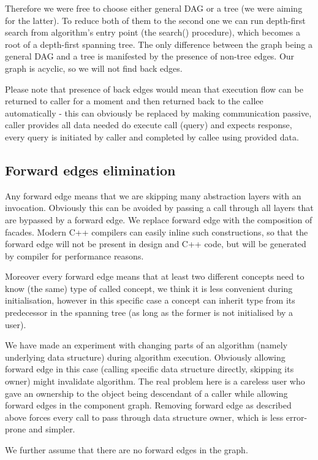 Therefore we were free to choose either general DAG or a tree (we were aiming
for the latter). To reduce both of them to the second one we can run
depth-first search from algorithm's entry point (the search() procedure), which
becomes a root of a depth-first spanning tree. The only difference between the
graph being a general DAG and a tree is manifested by the presence of non-tree
edges. Our graph is acyclic, so we will not find back edges.

Please note that presence of back edges would mean that execution flow can be
returned to caller for a moment and then returned back to the callee
automatically - this can obviously be replaced by making communication
passive, caller provides all data needed do execute call (query) and expects
response, every query is initiated by caller and completed by callee using
provided data.

\subsection{Forward edges elimination}
Any forward edge means that we are skipping many abstraction layers with an
invocation. Obviously this can be avoided by passing a call through all layers
that are bypassed by a forward edge. We replace forward edge with the composition
of facades. Modern C++ compilers can easily inline such constructions, so that
the forward edge will not be present in design and C++ code, but will be
generated by compiler for performance reasons.

Moreover every forward edge means that at least two different concepts need to
know (the same) type of called concept, we think it is less convenient during
initialisation, however in this specific case a concept can inherit type from
its predecessor in the spanning tree (as long as the former is not initialised
by a user).

We have made an experiment with changing parts of an algorithm (namely
underlying data structure) during algorithm execution. Obviously allowing
forward edge in this case (calling specific data structure directly, skipping
its owner) might invalidate algorithm. The real problem here is a careless user
who gave an ownership to the object being descendant of a caller while allowing
forward edges in the component graph. Removing forward edge as described above
forces every call to pass through data structure owner, which is less
error-prone and simpler.

We further assume that there are no forward edges in the graph.

